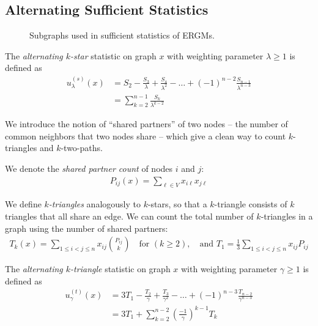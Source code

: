 \subsection{Alternating Sufficient Statistics}

\begin{figure}[!ht]
	\label{fig:graphdiagram}
	\centering
	
	\caption{Subgraphs used in sufficient statistics of ERGMs.}
\end{figure}


\begin{definition}
	 \label{def:altkstar}
	The \emph{alternating $k$-star} statistic on graph $x$ with weighting parameter $\lambda \geq 1$ is defined as
	\begin{align*}
	u^{(s)}_\lambda(x) & = S_2 - \frac{S_3}{\lambda} + \frac{S_4}{\lambda^2} - \dots + (-1)^{n-2} \frac{S_{n-1}}{\lambda^{n-3}} \\
	&  = \sum_{k = 2}^{n-1} \frac{S_k}{\lambda^{k-2}}
	\end{align*}
\end{definition}

We introduce the notion of ``shared partners'' of two nodes -- the number of common neighbors that two nodes share -- which give a clean way to count $k$-triangles and $k$-two-paths.
\begin{definition}
	\label{def:shared_partners}
	We denote the \emph{shared partner count} of nodes $i$ and $j$: 
	\begin{align}
	P_{ij}(x) = \sum_{\ell \in V} x_{i \ell} x_{j \ell}
	\end{align} 
\end{definition}

We define \emph{$k$-triangles} analogously to $k$-stars, so that a $k$-triangle consists of $k$ triangles that all share an edge. We can count the total number of $k$-triangles in a graph using the number of shared partners:
\begin{align}
\label{eq:k-triangle}
T_k(x) = \sum_{1 \leq i < j \leq n} x_{ij} \binom{P_{ij}}{k} \quad \text{for } (k \geq 2), \quad \text{and } T_1 = \frac{1}{3} \sum_{1 \leq i < j \leq n} x_{ij} P_{ij}
\end{align}

\begin{definition}
	\label{def:altktri}
	The \emph{alternating $k$-triangle} statistic on graph $x$ with weighting parameter $\gamma \geq 1$ is defined as
	\begin{align*}
	u^{(t)}_\gamma(x) & = 3T_1 - \frac{T_2}{\gamma} + \frac{T_3}{\gamma^2} - \dots + (-1)^{n-3} \frac{T_{n-2}}{\gamma^{n-3}} \\
	&  = 3 T_1 + \sum_{k = 2}^{n-2} \left(\frac{-1}{\gamma}\right)^{k-1} T_k
	\end{align*}
\end{definition}


